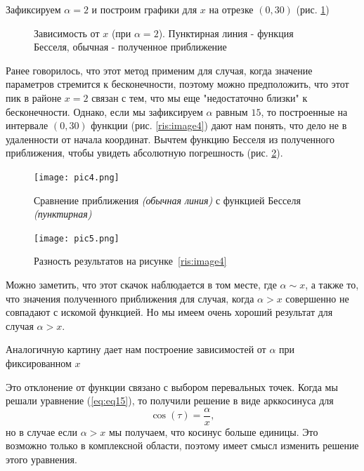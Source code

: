 \documentclass[14pt]{extarticle}
\begin{document}
Зафиксируем $\alpha=2$ и построим графики для $x$ на отрезке $(0, 30)$ (рис. \ref{ris:image3})

\begin{figure}[h!]
	\caption{Зависимость от $x$ (при $\alpha=2$). Пунктирная линия - функция Бесселя, обычная - полученное приближение}
	\label{ris:image3}
\end{figure}

Ранее говорилось, что этот метод применим для случая, когда значение параметров стремится к бесконечности, поэтому можно предположить, что этот пик в районе $x = 2$ связан с тем, что мы еще "недостаточно близки" к бесконечности. Однако, если мы зафиксируем $\alpha$ равным $15$, то построенные на интервале $(0,30)$ функции (рис. \ref{ris:image4}) дают нам понять, что дело не в удаленности от начала координат. Вычтем функцию Бесселя из полученного приближения, чтобы увидеть абсолютную погрешность (рис. \ref{ris:image5}).

\begin{figure}[h]
	\begin{center}
		\begin{minipage}[h]{0.45\linewidth}
			\texttt{[image: pic4.png]}
			\caption{Сравнение приближения \textit{(обычная линия)} с функцией Бесселя \textit{(пунктирная)}} %
			\label{ris:image4} %
		\end{minipage}
				\hfill 
		\begin{minipage}[h]{0.45\linewidth}
			\texttt{[image: pic5.png]}
			\caption{Разность результатов на рисунке~\ref{ris:image4}}
			\label{ris:image5}
		\end{minipage}
	\end{center}
\end{figure}

Можно заметить, что этот скачок наблюдается в том месте, где $\alpha \sim x$, а также то, что значения полученного приближения для случая, когда $\alpha > x$ совершенно не совпадают с искомой функцией. Но мы имеем очень хороший результат для случая $\alpha > x$.

Аналогичную картину дает нам построение зависимостей от $\alpha$ при фиксированном $x$

Это отклонение от функции связано с выбором перевальных точек. Когда мы решали уравнение (\ref{eq:eq15}), то получили решение в виде арккосинуса для
$$
\cos(\tau)=\frac{\alpha}{x},
$$
но в случае если $\alpha>x$ мы получаем, что косинус больше единицы. Это возможно только в комплексной области, поэтому имеет смысл изменить решение этого уравнения.\cite{Wong}
\end{document}
